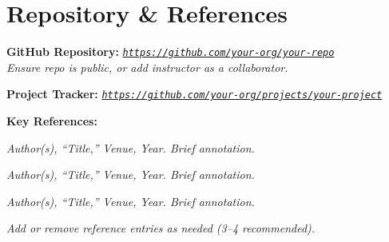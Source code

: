 \documentclass[11pt, letterpaper]{article}
\newcommand{\placeholder}[1]{\textcolor{placeholder}{\textit{#1}}}
\begin{document}
\section{Repository \& References}
\begin{tcolorbox}[sectionbox, height=4.5cm, valign=top]
  \textbf{GitHub Repository:}
  \placeholder{\href{https://github.com/your-org/your-repo}%
       {\texttt{https://github.com/your-org/your-repo}}}\\
    \placeholder{Ensure repo is public, or add instructor as a collaborator.}\vspace{1pt}

  \textbf{Project Tracker:} \placeholder{\href{https://github.com/your-org/your-repo}{\texttt{https://github.com/your-org/projects/your-project}}}

  \vspace{6pt}
  \textbf{Key References:}
  \begin{enumerate}[leftmargin=1.4em, itemsep=1pt, topsep=2pt, label={[\arabic*]}]
    \item \placeholder{Author(s), ``Title,'' Venue, Year. Brief annotation.}
    \item \placeholder{Author(s), ``Title,'' Venue, Year. Brief annotation.}
    \item \placeholder{Author(s), ``Title,'' Venue, Year. Brief annotation.}
  \end{enumerate}

  \vspace{4pt}
  \placeholder{Add or remove reference entries as needed (3--4 recommended).}
\end{tcolorbox}
\end{document}
